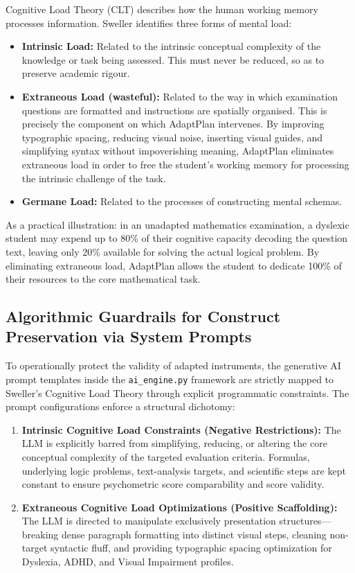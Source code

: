 \documentclass[12pt,a4paper]{report}
\begin{document}
Cognitive Load Theory (CLT) describes how the human working memory processes information. Sweller identifies three forms of mental load:

\begin{itemize}[leftmargin=*]
  \item \textbf{Intrinsic Load:} Related to the intrinsic conceptual complexity of the knowledge or task being assessed. This must never be reduced, so as to preserve academic rigour.
  \item \textbf{Extraneous Load (wasteful):} Related to the way in which examination questions are formatted and instructions are spatially organised. This is precisely the component on which AdaptPlan intervenes. By improving typographic spacing, reducing visual noise, inserting visual guides, and simplifying syntax without impoverishing meaning, AdaptPlan eliminates extraneous load in order to free the student's working memory for processing the intrinsic challenge of the task.
  \item \textbf{Germane Load:} Related to the processes of constructing mental schemas.
\end{itemize}

As a practical illustration: in an unadapted mathematics examination, a dyslexic student may expend up to 80\% of their cognitive capacity decoding the question text, leaving only 20\% available for solving the actual logical problem. By eliminating extraneous load, AdaptPlan allows the student to dedicate 100\% of their resources to the core mathematical task.

\subsection{Algorithmic Guardrails for Construct Preservation via System Prompts}
To operationally protect the validity of adapted instruments, the generative AI prompt templates inside the \texttt{ai\_engine.py} framework are strictly mapped to Sweller's Cognitive Load Theory through explicit programmatic constraints. The prompt configurations enforce a structural dichotomy:

\begin{enumerate}[leftmargin=*, label=\alph*.]
  \item \textbf{Intrinsic Cognitive Load Constraints (Negative Restrictions):} The LLM is explicitly barred from simplifying, reducing, or altering the core conceptual complexity of the targeted evaluation criteria. Formulas, underlying logic problems, text-analysis targets, and scientific steps are kept constant to ensure psychometric score comparability and score validity.
  \item \textbf{Extraneous Cognitive Load Optimizations (Positive Scaffolding):} The LLM is directed to manipulate exclusively presentation structures—breaking dense paragraph formatting into distinct visual steps, cleaning non-target syntactic fluff, and providing typographic spacing optimization for Dyslexia, ADHD, and Visual Impairment profiles.
\end{enumerate}
\end{document}
